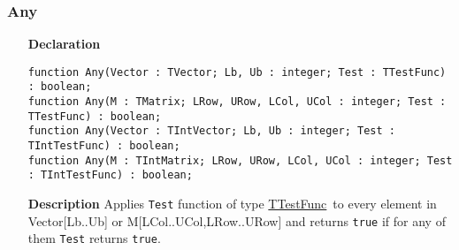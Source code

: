 \documentclass[12pt,a4paper,oneside]{report}
\newcommand{\declarationitem}[1]{\textbf{#1}}
\newcommand{\descriptiontitle}[1]{\textbf{#1}}
\newcommand{\code}[1]{\texttt{#1}}
\begin{document}
\subsubsection{Any}
\begin{itemize}
	\item[\declarationitem{Declaration}\hfill]
\begin{flushleft}
	\code{function Any(Vector : TVector; Lb, Ub : integer; Test : TTestFunc) : boolean;\\ \vspace{4pt}
	function Any(M : TMatrix; LRow, URow, LCol, UCol : integer; Test : TTestFunc) : boolean;\\ \vspace{4pt}
	function Any(Vector : TIntVector; Lb, Ub : integer; Test : TIntTestFunc) : boolean;\\ \vspace{4pt}
	function Any(M : TIntMatrix; LRow, URow, LCol, UCol : integer; Test : TIntTestFunc) : boolean;}
\end{flushleft}	
\item[\descriptiontitle{Description}]
Applies \code{Test} function of type \hyperref[uvecutils:ttestfunc]{TTestFunc}\ to every element in Vector[Lb..Ub] or M[LCol..UCol,LRow..URow] and returns \code{true} if for any of them \code{Test} returns \code{true}.
\end{itemize}
\end{document}
